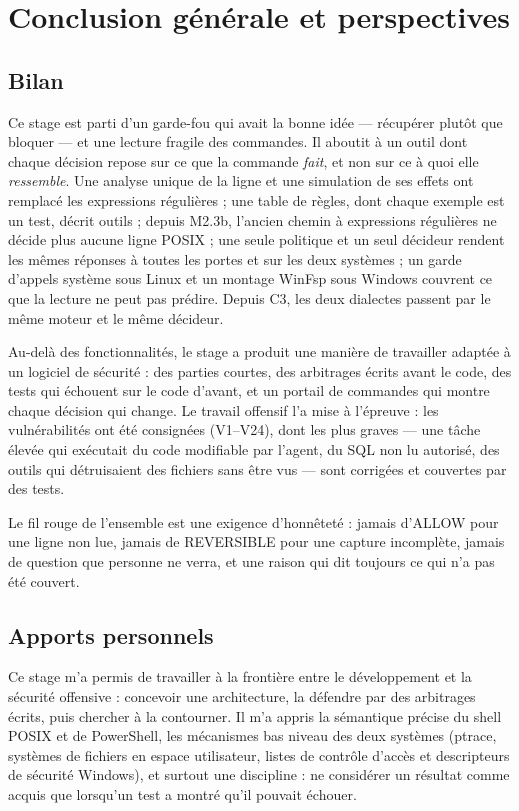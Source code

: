 \chapter*{Conclusion générale et perspectives}

\section*{Bilan}
Ce stage est parti d'un garde-fou qui avait la bonne idée --- récupérer plutôt que bloquer ---
et une lecture fragile des commandes. Il aboutit à un outil dont chaque décision repose sur ce
que la commande \emph{fait}, et non sur ce à quoi elle \emph{ressemble}. Une analyse unique de
la ligne et une simulation de ses effets ont remplacé les expressions régulières ; une table de
\nbregles{} règles, dont chaque exemple est un test, décrit \nboutils{} outils ; depuis M2.3b, l'ancien chemin
à expressions régulières ne décide plus aucune ligne POSIX ; une seule politique et un seul
décideur rendent les mêmes réponses à toutes les portes et sur les deux
systèmes ; un garde d'appels système sous Linux et un montage WinFsp sous Windows couvrent ce
que la lecture ne peut pas prédire. Depuis C3, les deux dialectes passent par le même moteur et le même
décideur.

Au-delà des fonctionnalités, le stage a produit une manière de travailler adaptée à un logiciel
de sécurité : des parties courtes, des arbitrages écrits avant le code, des tests qui échouent
sur le code d'avant, et un portail de \nbcorpus{} commandes qui montre chaque décision qui
change. Le travail offensif l'a mise à l'épreuve : les vulnérabilités ont été consignées (V1--V24),
dont les plus graves --- une tâche élevée qui exécutait du code modifiable par l'agent, du SQL
non lu autorisé, des outils qui détruisaient des fichiers sans être vus --- sont corrigées et
couvertes par des tests.

Le fil rouge de l'ensemble est une exigence d'honnêteté : jamais d'ALLOW pour une ligne non
lue, jamais de REVERSIBLE pour une capture incomplète, jamais de question que personne ne
verra, et une raison qui dit toujours ce qui n'a pas été couvert.

\section*{Apports personnels}
Ce stage m'a permis de travailler à la frontière entre le développement et la sécurité
offensive : concevoir une architecture, la défendre par des arbitrages écrits, puis chercher à
la contourner. Il m'a appris la sémantique précise du shell POSIX et de PowerShell, les
mécanismes bas niveau des deux systèmes (ptrace, systèmes de fichiers en espace utilisateur,
listes de contrôle d'accès et descripteurs de sécurité Windows), et surtout une discipline :
ne considérer un résultat comme acquis que lorsqu'un test a montré qu'il pouvait échouer.

